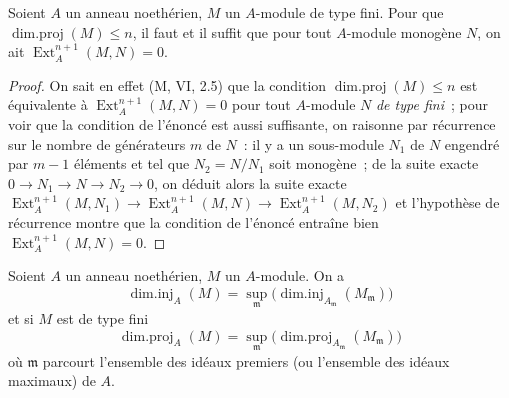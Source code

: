 \begin{lemma}[17.2.4]
\label{0.17.2.4-fr}
Soient $A$ un anneau noethérien, $M$ un $A$-module de type fini. Pour que
$\operatorname{dim.proj}(M)\leq n$, il faut et il suffit que pour tout
$A$-module \textup{monogène} $N$, on ait $\operatorname{Ext}^{n+1}_A(M,N)=0$.
\end{lemma}

\begin{proof}
On sait en effet (M, VI, 2.5) que la condition
$\operatorname{dim.proj}(M)\leq n$ est équivalente à
$\operatorname{Ext}^{n+1}_A(M,N)=0$ pour tout $A$-module $N$ \emph{de type
fini}~; pour voir que la condition de l'énoncé est aussi suffisante, on
raisonne par récurrence sur le nombre de générateurs $m$ de $N$~: il y a un
sous-module $N_1$ de $N$ engendré par $m-1$ éléments et tel que
$N_2=N/N_1$ soit monogène~; de la suite exacte
$0\longrightarrow N_1\longrightarrow N\longrightarrow N_2\longrightarrow0$,
on déduit alors la suite exacte
$\operatorname{Ext}^{n+1}_A(M,N_1)\longrightarrow
\operatorname{Ext}^{n+1}_A(M,N)\longrightarrow
\operatorname{Ext}^{n+1}_A(M,N_2)$ et l'hypothèse de récurrence montre que la
condition de l'énoncé entraîne bien $\operatorname{Ext}^{n+1}_A(M,N)=0$.
\end{proof}

\begin{corollary}[17.2.5]
\label{0.17.2.5-fr}
Soient $A$ un anneau noethérien, $M$ un $A$-module. On a
\begin{equation}
\label{0.17.2.5.1-fr}
\tag{17.2.5.1}
  \operatorname{dim.inj}_A(M)
  =\sup_{\mathfrak{m}}
  \bigl(\operatorname{dim.inj}_{A_{\mathfrak{m}}}(M_{\mathfrak{m}})\bigr)
\end{equation}
et si $M$ est de type fini
\begin{equation}
\label{0.17.2.5.2-fr}
\tag{17.2.5.2}
  \operatorname{dim.proj}_A(M)
  =\sup_{\mathfrak{m}}
  \bigl(\operatorname{dim.proj}_{A_{\mathfrak{m}}}(M_{\mathfrak{m}})\bigr)
\end{equation}
où $\mathfrak{m}$ parcourt l'ensemble des idéaux premiers (ou l'ensemble des
idéaux maximaux) de $A$.
\end{corollary}


